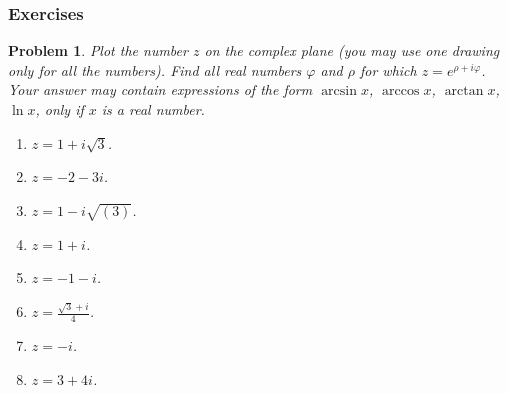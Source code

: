 \documentclass[12pt]{book}
\newtheorem{problem}[theorem]{Problem}
\begin{document}
\subsubsection{Exercises}
\begin{problem}\label{probComplexLogs}
Plot the number $z$ on the complex plane (you may use one drawing only for all the numbers). Find all real numbers $\varphi$ and $\rho$ for which $z=e^{\rho+i\varphi}$. Your answer may contain expressions of the form $\arcsin x$, $\arccos x$, $\arctan x$, $\ln x$, only if $x$ is a real number.
\begin{enumerate}
\item \label{prob1plussqrt3} $z=1+i\sqrt{3}$.
\item \label{prob2plus3i} $z=-2-3i$.
\item $z=1-i\sqrt{(3)}$.
\item $z=1+i$.
\item $z=-1-i$.
\item $z=\frac{\sqrt{3}+i}4$.
\item $z=-i$.
\item $z=3+4i$.
\end{enumerate}
\end{problem}
\end{document}
